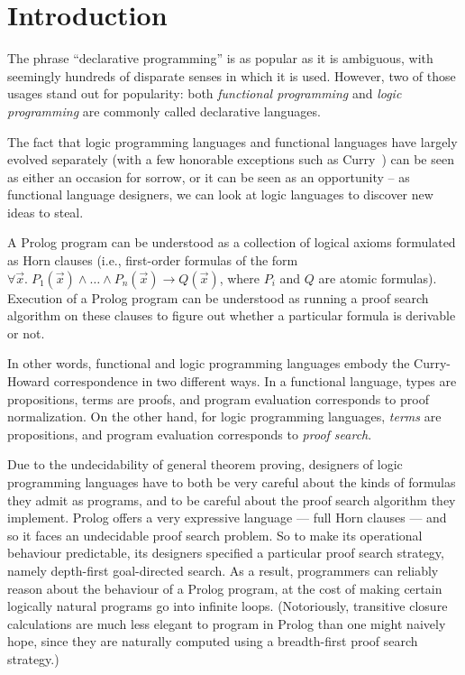 \section{Introduction}

The phrase ``declarative programming'' is as popular as it is
ambiguous, with seemingly hundreds of disparate senses in which it is
used. However, two of those usages stand out for popularity: both
\emph{functional programming} and \emph{logic programming} are
commonly called declarative languages.

The fact that logic programming languages and functional languages
have largely evolved separately (with a few honorable exceptions such
as Curry~\cite{curry}) can be seen as either an occasion for sorrow,
or it can be seen as an opportunity -- as functional language
designers, we can look at logic languages to discover new ideas to
steal.

A Prolog program can be understood as a collection of logical axioms
formulated as Horn clauses (i.e., first-order formulas of the form
$\forall \vec{x}.\;P_1(\vec{x}) \land \ldots \land P_n(\vec{x}) \to
Q(\vec{x})$, where $P_i$ and $Q$ are
atomic formulas).  Execution of a Prolog program can be understood as
running a proof search algorithm on these clauses to figure out
whether a particular formula is derivable or not.

In other words, functional and logic programming languages embody the
Curry-Howard correspondence in two different ways. In a functional
language, types are propositions, terms are proofs, and program
evaluation corresponds to proof normalization. On the other hand, for
logic programming languages, \emph{terms} are propositions, and
program evaluation corresponds to \emph{proof search}.

Due to the undecidability of general theorem proving, designers of
logic programming languages have to both be very careful about the
kinds of formulas they admit as programs, and to be careful about the
proof search algorithm they implement. Prolog offers a very expressive
language --- full Horn clauses --- and so it faces an undecidable
proof search problem. So to make its operational behaviour
predictable, its designers specified a particular proof search
strategy, namely depth-first goal-directed search. As a result,
programmers can reliably reason about the behaviour of a Prolog
program, at the cost of making certain logically natural programs go
into infinite loops. (Notoriously, transitive closure calculations are
much less elegant to program in Prolog than one might naively hope,
since they are naturally computed using a breadth-first proof search
strategy.)

